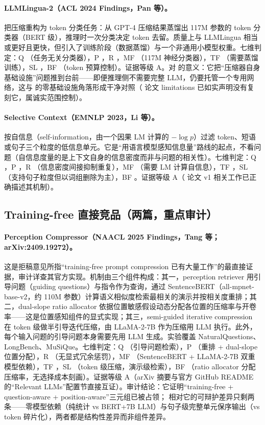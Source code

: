 \paragraph{LLMLingua-2（ACL 2024 Findings，Pan 等）。}
把压缩重构为 token 分类任务：从 GPT-4 压缩结果蒸馏出 117M 参数的 token 分类器（BERT 级），推理时一次分类决定 token 去留。质量上与 LLMLingua 相当或更好且更快，但引入了训练阶段（数据蒸馏）与一个非通用小模型权重。七维判定：Q \no{}（任务无关分类器），P \no{}，R \no{}，MF \no{}（117M 神经分类器），TF \no{}（需要蒸馏训练），SL \no{}，BF \ck{}（token 预算控制）。证据等级 A。对 \sieve{} 的意义：它把``压缩器自身基础设施''问题推到台前——即便推理侧不需要完整 LLM，仍要托管一个专用网络，这与 \sieve{} 的零基础设施角落形成干净对照（\sieve{} 论文 limitations 已如实声明没有复刻它，属诚实范围控制）。

\paragraph{Selective Context（EMNLP 2023，Li 等）。}
按自信息（self-information，由一个因果 LM 计算的 $-\log p$）过滤 token、短语或句子三个粒度的低信息单元。它是``用语言模型感知信息量''路线的起点，不看问题（自信息度量的是上下文自身的信息密度而非与问题的相关性）。七维判定：Q \no{}，P \no{}，R \partl{}（信息密度间接抑制重复），MF \no{}（需要 LM 计算自信息），TF \ck{}，SL \partl{}（支持句子粒度但以词组删除为主），BF \no{}。证据等级 A（\sieve{} 论文 v1 相关工作已正确描述其机制）。

\subsection{Training-free 直接竞品（两篇，重点审计）}

\paragraph{Perception Compressor（NAACL 2025 Findings，Tang 等；arXiv:2409.19272）。}
这是拒稿意见所指``training-free prompt compression 已有大量工作''的最直接证据，审计详查其官方实现。机制由三个组件构成：其一，perception retriever 用引导问题（guiding questions）与指令作为查询，通过 SentenceBERT（all-mpnet-base-v2，约 110M 参数）计算语义相似度检索最相关的演示并按相关度重排；其二，dual-slope ratio allocator 依据位置敏感假设动态分配各位置的压缩率与开卷率——这是位置感知组件的显式实现；其三，semi-guided iterative compression 在 token 级做半引导迭代压缩，由 LLaMA-2-7B 作为压缩用 LLM 执行。此外，每个输入问题的引导问题本身需要先用 LLM 生成。实验覆盖 NaturalQuestions、LongBench、MuSiQue。七维判定：Q \ck{}（引导问题检索），P \ck{}（重排 + dual-slope 位置分配），R \no{}（无显式冗余惩罚），MF \no{}（SentenceBERT + LLaMA-2-7B 双重模型依赖），TF \ck{}，SL \no{}（token 级压缩，演示级检索），BF \partl{}（ratio allocator 分配压缩率，无选择成本刻画）。证据等级 A（arXiv 摘要与官方 GitHub README 的``Relevant LLMs''配置节直接互证）。审计结论：它证明``training-free + question-aware + position-aware''三元组已被占领；\sieve{} 相对它的可辩护差异只剩两条——零模型依赖（纯统计 vs BERT+7B LLM）与句子级完整单元保序输出（vs token 碎片化），两者都是结构性差异而非组件差异。

